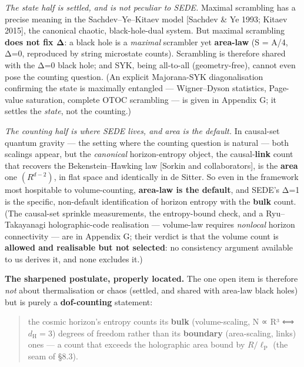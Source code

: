 \documentclass[
  10pt,
]{article}
\begin{document}
\emph{The state half is settled, and is not peculiar to SEDE.} Maximal
scrambling has a precise meaning in the Sachdev--Ye--Kitaev model
{[}Sachdev \& Ye 1993; Kitaev 2015{]}, the canonical chaotic,
black-hole-dual system. But maximal scrambling \textbf{does not fix Δ}:
a black hole is a \emph{maximal} scrambler yet \textbf{area-law} (S =
A/4, Δ=0, reproduced by string microstate counts). Scrambling is
therefore shared with the Δ=0 black hole; and SYK, being all-to-all
(geometry-free), cannot even pose the counting question. (An explicit
Majorana-SYK diagonalisation confirming the state is maximally entangled
--- Wigner--Dyson statistics, Page-value saturation, complete OTOC
scrambling --- is given in Appendix G; it settles the \emph{state}, not
the counting.)

\emph{The counting half is where SEDE lives, and area is the default.}
In causal-set quantum gravity --- the setting where the counting
question is natural --- both scalings appear, but the \emph{canonical}
horizon-entropy object, the causal-\textbf{link} count that recovers the
Bekenstein--Hawking law {[}Sorkin and collaborators{]}, is the
\textbf{area} one \((R^{d-2})\), in flat space and identically in de
Sitter. So even in the framework most hospitable to volume-counting,
\textbf{area-law is the default}, and SEDE's Δ=1 is the specific,
non-default identification of horizon entropy with the \textbf{bulk}
count. (The causal-set sprinkle measurements, the entropy-bound check,
and a Ryu--Takayanagi holographic-code realisation --- volume-law
requires \emph{nonlocal} horizon connectivity --- are in Appendix G;
their verdict is that the volume count is \textbf{allowed and realisable
but not selected}: no consistency argument available to us derives it,
and none excludes it.)

\textbf{The sharpened postulate, properly located.} The one open item is
therefore \emph{not} about thermalisation or chaos (settled, and shared
with area-law black holes) but is purely a \textbf{dof-counting}
statement:

\begin{quote}
the cosmic horizon's entropy counts its \textbf{bulk} (volume-scaling, N
∝ R³ ⟺ \(d_{\mathrm{H}} = 3\)) degrees of freedom rather than its
\textbf{boundary} (area-scaling, links) ones --- a count that exceeds
the holographic area bound by \(R/\ell _{\mathrm{P}}\) (the seam of
§8.3).
\end{quote}
\end{document}
